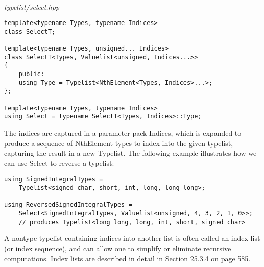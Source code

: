 \hspace*{\fill} \\ %
\noindent
\textit{typelist/select.hpp}
\begin{lstlisting}[style=styleCXX]
template<typename Types, typename Indices>
class SelectT;

template<typename Types, unsigned... Indices>
class SelectT<Types, Valuelist<unsigned, Indices...>>
{
	public:
	using Type = Typelist<NthElement<Types, Indices>...>;
};

template<typename Types, typename Indices>
using Select = typename SelectT<Types, Indices>::Type;
\end{lstlisting}

The indices are captured in a parameter pack Indices, which is expanded to produce a sequence of NthElement types to index into the given typelist, capturing the result in a new Typelist. The following example illustrates how we can use Select to reverse a typelist:

\begin{lstlisting}[style=styleCXX]
using SignedIntegralTypes =
	Typelist<signed char, short, int, long, long long>;

using ReversedSignedIntegralTypes =
	Select<SignedIntegralTypes, Valuelist<unsigned, 4, 3, 2, 1, 0>>;
	// produces Typelist<long long, long, int, short, signed char>
\end{lstlisting}

A nontype typelist containing indices into another list is often called an index list (or index sequence), and can allow one to simplify or eliminate recursive computations. Index lists are described in detail in Section 25.3.4 on page 585.










































